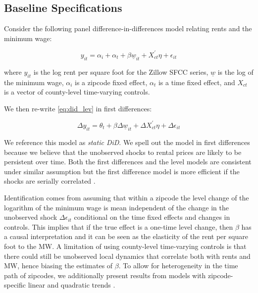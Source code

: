 \subsection{Baseline Specifications}
Consider the following panel difference-in-differences model relating rents and the minimum wage:

\begin{equation}\label{eq:did_lev}
    y_{it} = \alpha_i + \alpha_t + \beta \underline{w}_{it} + X^{'}_{ct}\eta + \epsilon_{it}
\end{equation}
    
where $y_{it}$ is the log rent per square foot for the Zillow SFCC series, $\underline{w}$ is the 
log of the minimum wage, $\alpha_i$ is a zipcode fixed effect, $\alpha_t$ is a time fixed effect, 
and $X_{ct}$ is a vector of county-level time-varying controls.


We then re-write \autoref{eq:did_lev} in first differences:
    
\begin{equation}\label{eq:did}
        \Delta y_{it} =\theta_t + \beta \Delta \underline{w}_{it} + \Delta X^{'}_{ct}\eta + \Delta \epsilon_{it}
\end{equation}

We reference this model as \textit{static DiD}. We spell out the model in first differences because 
we believe that the unobserved shocks to rental prices are likely to be persistent over time. Both 
the first differences and the level models are consistent under similar assumption but the first 
difference model is more efficient if the shocks are serially correlated \parencite{wooldridge2010}.

Identification comes from assuming that within a zipcode the level change of the logarithm 
of the minimum wage is mean independent of the change in the unobserved shock $\Delta \epsilon_{it}$ 
conditional on the time fixed effects and changes in controls. This implies that if 
the true effect is a one-time level change, then $\beta$ has a causal interpretation and it can be 
seen as the elasticity of the rent per square foot to the MW.  A limitation of using county-level 
time-varying controls is that there could still be unobserved local dynamics that correlate both with rents and MW, 
hence biasing the estimates of $\beta$. To allow for heterogeneity in the time 
path of zipcodes, we additionally present results from models with zipcode-specific linear 
and quadratic trends \parencite{angrist2008mostly}.
    
